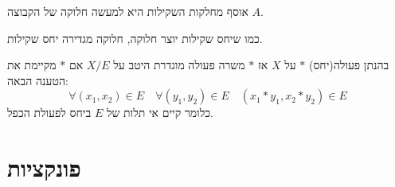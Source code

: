 \documentclass{tstextbook}
\begin{document}
\begin{corollary}
אוסף מחלקות השקילות היא למעשה חלוקה של הקבוצה \(A\).

\end{corollary}
\begin{remark}
כמו שיחס שקילות יוצר חלוקה, חלוקה מגדירה יחס שקילות.

\end{remark}
\begin{definition}
בהנתן פעולה(יחס) \(*\) על \(X\) אז \(*\) משרה פעולה מוגדרת היטב על \(X / E\) אם \(*\) מקיימת את הטענה הבאה:
$$\forall (x_{1},x_{2})\in E\quad \forall(y_{1},y_{2})\in E\quad (x_{1}*y_{1},x_{2}*y_{2})\in E$$
כלומר קיים אי תלות של \(E\) ביחס לפעולת הכפל.

\end{definition}
\section{פונקציות}
\end{document}
